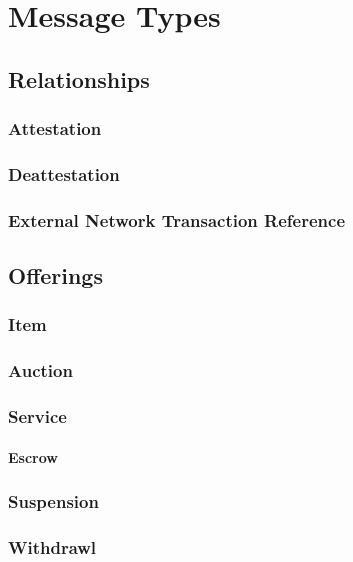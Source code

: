 \chapter{Message Types}

\section{Relationships}

\subsection{Attestation}

\subsection{Deattestation}

\subsection{External Network Transaction Reference}

\section{Offerings}

\subsection{Item}

\subsection{Auction}

\subsection{Service}

\subsubsection{Escrow}

\subsection{Suspension}

\subsection{Withdrawl}

